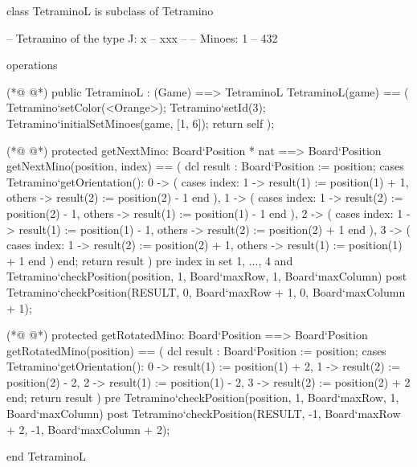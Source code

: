 \begin{vdmpp}[breaklines=true]
class TetraminoL is subclass of Tetramino
  
 -- Tetramino of the type J: x
 --       xxx
 --
 -- Minoes:         1
 --        432


 operations
 
(*@
\label{TetraminoL:12}
@*)
  public TetraminoL : (Game) ==> TetraminoL
  TetraminoL(game) == (
   Tetramino`setColor(<Orange>);
   Tetramino`setId(3);
   Tetramino`initialSetMinoes(game, [1, 6]);
   return self
  );

(*@
\label{getNextMino:20}
@*)
  protected getNextMino: Board`Position * nat ==> Board`Position
  getNextMino(position, index) == (
   dcl result : Board`Position := position;
   cases Tetramino`getOrientation():
    0 -> (
     cases index:
      1 -> result(1) := position(1) + 1,
      others -> result(2) := position(2) - 1
     end
    ),
    1 -> (
     cases index:
      1 -> result(2) := position(2) - 1,
      others -> result(1) := position(1) - 1
     end
    ),
    2 -> (
     cases index:
      1 -> result(1) := position(1) - 1,
      others -> result(2) := position(2) + 1
     end
    ),
    3 -> (
     cases index:
      1 -> result(2) := position(2) + 1,
      others -> result(1) := position(1) + 1
     end
    )
   end;
   return result
  )
  pre index in set {1, ..., 4} 
   and Tetramino`checkPosition(position, 1, Board`maxRow, 1, Board`maxColumn)
  post Tetramino`checkPosition(RESULT, 0, Board`maxRow + 1, 0, Board`maxColumn + 1);
   
(*@
\label{getRotatedMino:55}
@*)
  protected getRotatedMino: Board`Position ==> Board`Position
  getRotatedMino(position) == (
   dcl result : Board`Position := position;
   cases Tetramino`getOrientation():
    0 -> result(1) := position(1) + 2,
    1 -> result(2) := position(2) - 2,
    2 -> result(1) := position(1) - 2,
    3 -> result(2) := position(2) + 2
   end;
   return result
  )
  pre Tetramino`checkPosition(position, 1, Board`maxRow, 1, Board`maxColumn)
  post Tetramino`checkPosition(RESULT, -1, Board`maxRow + 2, -1, Board`maxColumn + 2); 

end TetraminoL
\end{vdmpp}
